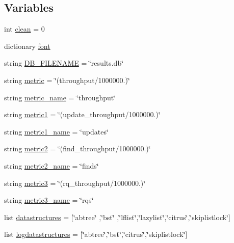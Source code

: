\subsection*{Variables}
\begin{DoxyCompactItemize}
\item 
int \hyperlink{namespacegraphs_a8116c280bbc324533b3bde92528d9edb}{clean} = 0
\item 
dictionary \hyperlink{namespacegraphs_a156f07dcbb979d6e2f598038daab686e}{font}
\item 
string \hyperlink{namespacegraphs_a9de39e4714ae5b26f7e89684b1024354}{D\+B\+\_\+\+F\+I\+L\+E\+N\+A\+ME} = \char`\"{}results.\+db\char`\"{}
\item 
string \hyperlink{namespacegraphs_a7f1d0aeed3f9ddfe995e0910fff50431}{metric} = \char`\"{}(throughput/1000000.)\char`\"{}
\item 
string \hyperlink{namespacegraphs_a0c8becd7cf726f44e9c148109fcf06af}{metric\+\_\+name} = \char`\"{}throughput\char`\"{}
\item 
string \hyperlink{namespacegraphs_a68d13065728a87168cb8c19ff1bd32ce}{metric1} = \char`\"{}(update\+\_\+throughput/1000000.)\char`\"{}
\item 
string \hyperlink{namespacegraphs_a9a5cdf32dfaa1c8b350140ace4b5bb02}{metric1\+\_\+name} = \char`\"{}updates\char`\"{}
\item 
string \hyperlink{namespacegraphs_a8ef3eba033178469dc23898911cf8254}{metric2} = \char`\"{}(find\+\_\+throughput/1000000.)\char`\"{}
\item 
string \hyperlink{namespacegraphs_a580a5506835da9113d05e523b5dd0951}{metric2\+\_\+name} = \char`\"{}finds\char`\"{}
\item 
string \hyperlink{namespacegraphs_a9c04990393b55b01ca18c14702b4e0e3}{metric3} = \char`\"{}(rq\+\_\+throughput/1000000.)\char`\"{}
\item 
string \hyperlink{namespacegraphs_a6fc3ee1433327b581391af5a2107d4c7}{metric3\+\_\+name} = \char`\"{}rqs\char`\"{}
\item 
list \hyperlink{namespacegraphs_a72f429cf7403a53b25512bb577a3c676}{datastructures} = \mbox{[}\char`\"{}abtree\char`\"{} ,\char`\"{}bst\char`\"{} ,\char`\"{}lflist\char`\"{},\char`\"{}lazylist\char`\"{},\char`\"{}citrus\char`\"{},\char`\"{}skiplistlock\char`\"{}\mbox{]}
\item 
list \hyperlink{namespacegraphs_a3d840fdf3d8f4d0b19182f9d6c532dec}{logdatastructures} = \mbox{[}\char`\"{}abtree\char`\"{},\char`\"{}bst\char`\"{},\char`\"{}citrus\char`\"{},\char`\"{}skiplistlock\char`\"{}\mbox{]}

\end{DoxyCompactItemize}
